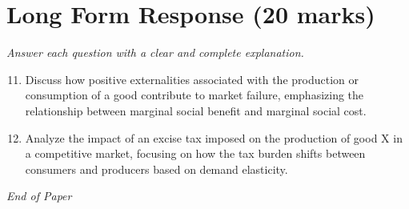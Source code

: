 \documentclass[12pt]{article}
\begin{document}
\section*{Long Form Response (20 marks)}
\textit{Answer each question with a clear and complete explanation.}
\begin{enumerate}[label=\arabic*.]
\setcounter{enumi}{10}
\item Discuss how positive externalities associated with the production or consumption of a good contribute to market failure, emphasizing the relationship between marginal social benefit and marginal social cost.
\item Analyze the impact of an excise tax imposed on the production of good X in a competitive market, focusing on how the tax burden shifts between consumers and producers based on demand elasticity.
\end{enumerate}

\vfill
\noindent\textit{End of Paper}
\end{document}
